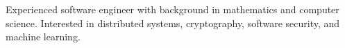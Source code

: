 \documentclass[9pt]{developercv} %
\begin{document}
\vspace{0.5cm}



\begin{minipage}[t]{1\textwidth} %
	\vspace{-\baselineskip} %
  Experienced software engineer with background in mathematics and computer science. Interested in distributed systems, cryptography, software security, and machine learning.

\end{minipage}
\hfill %



\end{document}
